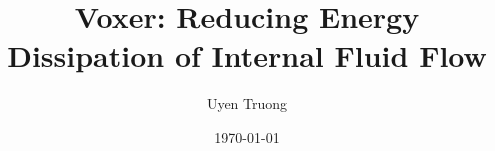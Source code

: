 
\def\thesislang{finnish} %

\def\secondlang{english} %

\author{Uyen Truong} %
\def\thesis{Thesis}%

\def\alaotsikko{Comparative testing of Voxer on water cooling piping system at Keravan Energy } %

\def\otsikko{Voxer: Reducing Energy Dissipation of Internal Fluid Flow}
\def\tutkinto{Bachelor of Engineering} %
\def\kohjelma{Environmental Engineering}
\def\suuntautumis{Water Resource Management}
\def\ohjaajat{
Titteli Etunimi Sukunimi\newline
Titteli Etunimi Sukunimi
}
\def\avainsanat{avainsanat}
\def\pvm{\specialdate\today}

\title{Voxer: Reducing Energy Dissipation of Internal Fluid Flow}
\def\metropoliadegree {Bachelor of Engineering} %
\def\metropoliadegreeprogramme {Environmental Engineering}
\def\metropoliaspecialisation {Water Resource Management}
\def\metropoliainstructors {
Kaj Lindedahl, Principal Lecturer, Metropolia UAS\newline
Prof. Juhani Pylkkänen, Chief Engineer, SansOx Ltd
}
\def\metropoliakeywords {SansOx, vortex, Voxer, fluid mechanics, reduce energy dissipation, reduce turbulence, pressure loss}
\date{\longmonth\today}


